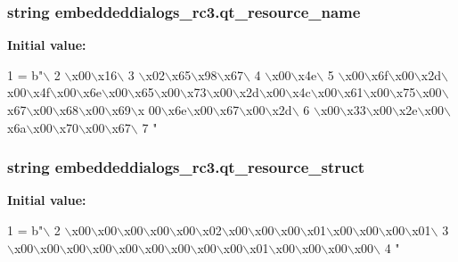 \subsubsection[{qt\+\_\+resource\+\_\+name}]{\setlength{\rightskip}{0pt plus 5cm}string embeddeddialogs\+\_\+rc3.\+qt\+\_\+resource\+\_\+name}\label{namespaceembeddeddialogs__rc3_a355a21b6e6898425edab1e2de5d352aa}
{\bfseries Initial value\+:}
\begin{DoxyCode}
1 = b\textcolor{stringliteral}{"\(\backslash\)}
2 \textcolor{stringliteral}{\(\backslash\)x00\(\backslash\)x16\(\backslash\)}
3 \textcolor{stringliteral}{\(\backslash\)x02\(\backslash\)x65\(\backslash\)x98\(\backslash\)x67\(\backslash\)}
4 \textcolor{stringliteral}{\(\backslash\)x00\(\backslash\)x4e\(\backslash\)}
5 \textcolor{stringliteral}{\(\backslash\)x00\(\backslash\)x6f\(\backslash\)x00\(\backslash\)x2d\(\backslash\)x00\(\backslash\)x4f\(\backslash\)x00\(\backslash\)x6e\(\backslash\)x00\(\backslash\)x65\(\backslash\)x00\(\backslash\)x73\(\backslash\)x00\(\backslash\)x2d\(\backslash\)x00\(\backslash\)x4c\(\backslash\)x00\(\backslash\)x61\(\backslash\)x00\(\backslash\)x75\(\backslash\)x00\(\backslash\)x67\(\backslash\)x00\(\backslash\)x68\(\backslash\)x00\(\backslash\)x69\(\backslash\)x
      00\(\backslash\)x6e\(\backslash\)x00\(\backslash\)x67\(\backslash\)x00\(\backslash\)x2d\(\backslash\)}
6 \textcolor{stringliteral}{\(\backslash\)x00\(\backslash\)x33\(\backslash\)x00\(\backslash\)x2e\(\backslash\)x00\(\backslash\)x6a\(\backslash\)x00\(\backslash\)x70\(\backslash\)x00\(\backslash\)x67\(\backslash\)}
7 \textcolor{stringliteral}{"}
\end{DoxyCode}
\hypertarget{namespaceembeddeddialogs__rc3_a20ab56417ccf12d5b547afc9fb3d1eb0}{}
\subsubsection[{qt\+\_\+resource\+\_\+struct}]{\setlength{\rightskip}{0pt plus 5cm}string embeddeddialogs\+\_\+rc3.\+qt\+\_\+resource\+\_\+struct}\label{namespaceembeddeddialogs__rc3_a20ab56417ccf12d5b547afc9fb3d1eb0}
{\bfseries Initial value\+:}
\begin{DoxyCode}
1 = b\textcolor{stringliteral}{"\(\backslash\)}
2 \textcolor{stringliteral}{\(\backslash\)x00\(\backslash\)x00\(\backslash\)x00\(\backslash\)x00\(\backslash\)x00\(\backslash\)x02\(\backslash\)x00\(\backslash\)x00\(\backslash\)x00\(\backslash\)x01\(\backslash\)x00\(\backslash\)x00\(\backslash\)x00\(\backslash\)x01\(\backslash\)}
3 \textcolor{stringliteral}{\(\backslash\)x00\(\backslash\)x00\(\backslash\)x00\(\backslash\)x00\(\backslash\)x00\(\backslash\)x00\(\backslash\)x00\(\backslash\)x00\(\backslash\)x00\(\backslash\)x01\(\backslash\)x00\(\backslash\)x00\(\backslash\)x00\(\backslash\)x00\(\backslash\)}
4 \textcolor{stringliteral}{"}
\end{DoxyCode}
